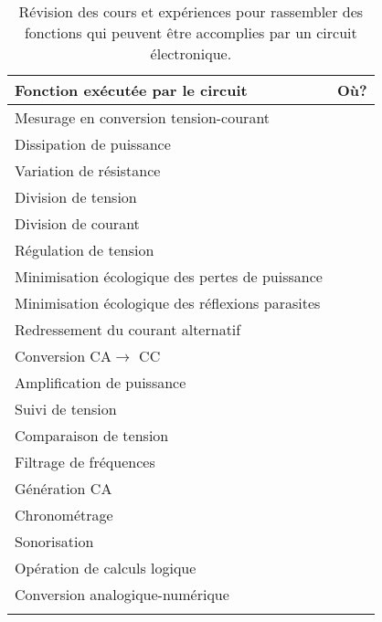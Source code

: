\documentclass{article}
\begin{document}
\begin{center}
\begin{longtable}{ p{} p{} } 
\hline
Fonction exécutée par le circuit & Où?\\
\hline
\hline
Mesurage en conversion tension-courant & \\
Dissipation de puissance  &  \\
Variation de résistance & \\
Division de tension &  \\
Division de courant & \\
Régulation de tension & \\
Minimisation écologique des pertes de puissance & \\
Minimisation écologique des réflexions parasites & \\
Redressement du courant alternatif & \\
Conversion CA$\rightarrow$ CC & \\
Amplification de puissance & \\
Suivi de tension & \\
Comparaison de tension & \\
Filtrage de fréquences & \\
Génération CA & \\
Chronométrage & \\
Sonorisation & \\
Opération de calculs logique & \\
Conversion analogique-numérique & \\
\hline
\caption{Révision des cours et expériences pour rassembler des fonctions qui peuvent être accomplies par un circuit électronique.}
\label{tab:electronic_fcts}
\end{longtable}
\end{center}
\end{document}
